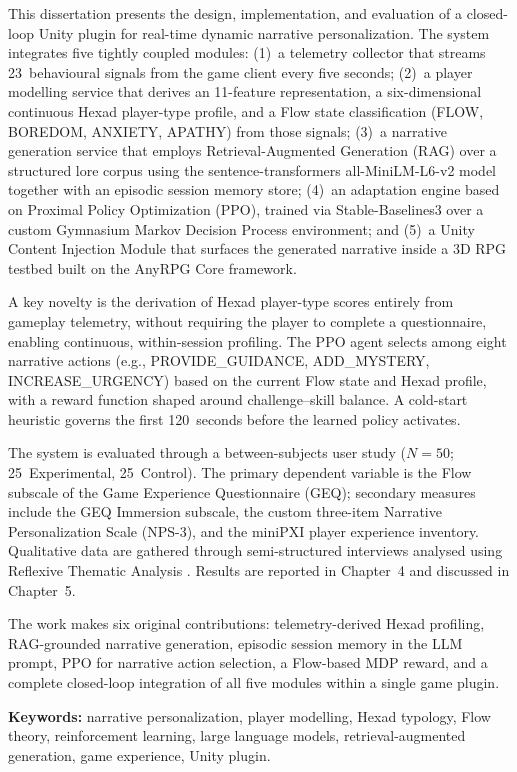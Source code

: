 This dissertation presents the design, implementation, and evaluation of a closed-loop Unity plugin for real-time dynamic narrative personalization. The system integrates five tightly coupled modules: (1)~a telemetry collector that streams 23~behavioural signals from the game client every five seconds; (2)~a player modelling service that derives an 11-feature representation, a six-dimensional continuous Hexad player-type profile, and a Flow state classification (FLOW, BOREDOM, ANXIETY, APATHY) from those signals; (3)~a narrative generation service that employs Retrieval-Augmented Generation (RAG) over a structured lore corpus using the sentence-transformers all-MiniLM-L6-v2 model together with an episodic session memory store; (4)~an adaptation engine based on Proximal Policy Optimization (PPO), trained via Stable-Baselines3 over a custom Gymnasium Markov Decision Process environment; and (5)~a Unity Content Injection Module that surfaces the generated narrative inside a 3D RPG testbed built on the AnyRPG Core framework.

A key novelty is the derivation of Hexad player-type scores entirely from gameplay telemetry, without requiring the player to complete a questionnaire, enabling continuous, within-session profiling. The PPO agent selects among eight narrative actions (e.g., PROVIDE\_GUIDANCE, ADD\_MYSTERY, INCREASE\_URGENCY) based on the current Flow state and Hexad profile, with a reward function shaped around challenge--skill balance. A cold-start heuristic governs the first 120~seconds before the learned policy activates.

The system is evaluated through a between-subjects user study ($N = 50$; 25~Experimental, 25~Control). The primary dependent variable is the Flow subscale of the Game Experience Questionnaire (GEQ); secondary measures include the GEQ Immersion subscale, the custom three-item Narrative Personalization Scale (NPS-3), and the miniPXI player experience inventory. Qualitative data are gathered through semi-structured interviews analysed using Reflexive Thematic Analysis \citep{braun2022thematic}. Results are reported in Chapter~4 and discussed in Chapter~5.

The work makes six original contributions: telemetry-derived Hexad profiling, RAG-grounded narrative generation, episodic session memory in the LLM prompt, PPO for narrative action selection, a Flow-based MDP reward, and a complete closed-loop integration of all five modules within a single game plugin.

\vspace{0.5cm}
\noindent\textbf{Keywords:} narrative personalization, player modelling, Hexad typology, Flow theory, reinforcement learning, large language models, retrieval-augmented generation, game experience, Unity plugin.

